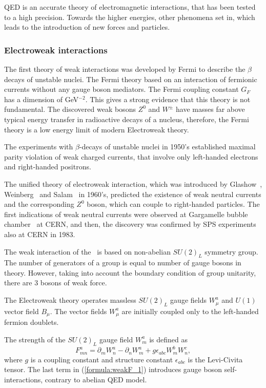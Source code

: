 QED is an accurate theory of electromagnetic interactions, that has been tested to a high precision. 
Towards the higher energies, other phenomena set in, which leads to the introduction of new forces and particles. 

\subsubsection{Electroweak interactions}
\label{sec:EWT_SM}
The first theory of weak interactions was developed by Fermi to describe the $\beta$ decays of unstable nuclei. The Fermi theory based on an interaction of fermionic currents without any gauge boson mediators. The Fermi coupling constant $G_F$ has a dimension of GeV$^{-2}$. This gives a strong evidence that this theory is not fundamental. The discovered weak bosons $Z^0$ and $W^\pm$ have masses far above typical energy transfer in radioactive decays of a nucleus, therefore, the Fermi theory is a low energy limit of modern Electroweak theory.

The experiments with $\beta$-decays of unstable nuclei in 1950's established maximal parity violation of weak charged currents, that involve only left-handed electrons and right-handed positrons. 

The unified theory of electroweak interaction, which was introduced by Glashow~\cite{Glashow:1961tr}, Weinberg~\cite{Weinberg:1967tq} and Salam~\cite{Salam:1968rm} in 1960's, predicted the existence of weak neutral currents and the corresponding $Z^0$ boson, which can couple to right-handed particles. 
The first indications of weak neutral currents were observed at Gargamelle bubble chamber~\cite{Hasert:1973ff} at CERN, and then, the discovery was confirmed by SPS experiments~\cite{BAGNAIA1983130} also at CERN in 1983. 

The weak interaction of the \sm\ is based on non-abelian $SU(2)_L$ symmetry group. The number of generators of a group is equal to number of gauge bosons in theory. However, taking into account the boundary condition of group unitarity, there are 3 bosons of weak force. 

The Electroweak theory operates massless $SU(2)_L$ gauge fields $W^a_\mu$ and $U(1)$ vector field $B_\mu$. The vector fields $W^a_\mu$ are initially coupled only to the left-handed fermion doublets.

The strength of the $SU(2)_L$ gauge field $W_m^a$ is defined as
\begin{equation}
	F_{mn}^a =  \partial_m W_n^a - \partial_n W_m^a + g \epsilon_{abc}W_m^b W_n^c,
    \label{formula:weakF_1}
\end{equation}
where $g$ is a coupling constant and structure constant $\epsilon_{abc}$ is the Levi-Civita tensor. The last term in (\ref{formula:weakF_1}) introduces gauge boson self-interactions, contrary to abelian QED model. 

